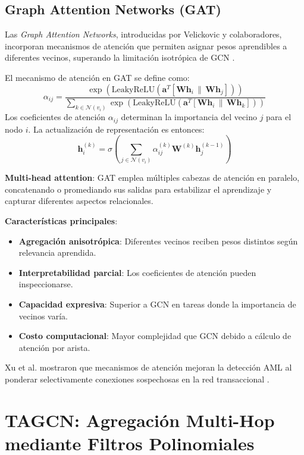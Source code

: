 \subsection{Graph Attention Networks (GAT)}

Las \textit{Graph Attention Networks}, introducidas por Velickovic y colaboradores, incorporan mecanismos de atención que permiten asignar pesos aprendibles a diferentes vecinos, superando la limitación isotrópica de GCN \cite{Velickovic2018GraphNetworks}.

El mecanismo de atención en GAT se define como:
\[ \alpha_{ij} = \frac{\exp(\text{LeakyReLU}(\mathbf{a}^T[\mathbf{W}\mathbf{h}_i \, \| \, \mathbf{W}\mathbf{h}_j]))}{\sum_{k \in \mathcal{N}(v_i)} \exp(\text{LeakyReLU}(\mathbf{a}^T[\mathbf{W}\mathbf{h}_i \, \| \, \mathbf{W}\mathbf{h}_k]))} \]
Los coeficientes de atención $\alpha_{ij}$ determinan la importancia del vecino $j$ para el nodo $i$. La actualización de representación es entonces:
\[ \mathbf{h}_i^{(k)} = \sigma \left( \sum_{j \in \mathcal{N}(v_i)} \alpha_{ij}^{(k)} \mathbf{W}^{(k)} \mathbf{h}_j^{(k-1)} \right) \]

\textbf{Multi-head attention}: GAT emplea múltiples cabezas de atención en paralelo, concatenando o promediando sus salidas para estabilizar el aprendizaje y capturar diferentes aspectos relacionales.

\textbf{Características principales}:
\begin{itemize}
    \item \textbf{Agregación anisotrópica}: Diferentes vecinos reciben pesos distintos según relevancia aprendida.
    \item \textbf{Interpretabilidad parcial}: Los coeficientes de atención pueden inspeccionarse.
    \item \textbf{Capacidad expresiva}: Superior a GCN en tareas donde la importancia de vecinos varía.
    \item \textbf{Costo computacional}: Mayor complejidad que GCN debido a cálculo de atención por arista.
\end{itemize}

Xu et al. mostraron que mecanismos de atención mejoran la detección AML al ponderar selectivamente conexiones sospechosas en la red transaccional \cite{Lin2026DetectingLaundering}.

\section{TAGCN: Agregación Multi-Hop mediante Filtros Polinomiales}


